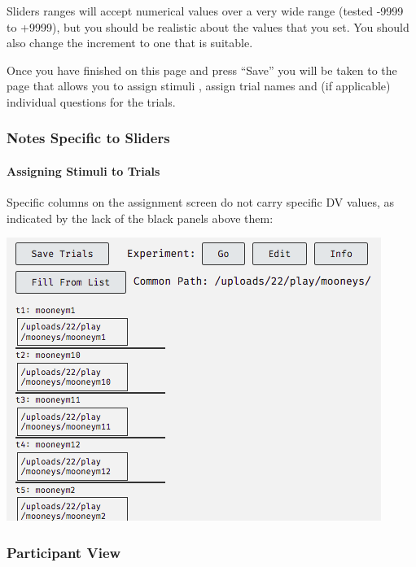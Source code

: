 \documentclass[]{book}
\let\oldparagraph\paragraph
\renewcommand{\paragraph}[1]{\oldparagraph{#1}\mbox{}}
\begin{document}
Sliders ranges will accept numerical values over a very wide range
(tested -9999 to +9999), but you should be realistic about the values
that you set. You should also change the increment to one that is
suitable.

Once you have finished on this page and press ``Save'' you will be taken
to the page that allows you to assign stimuli , assign trial names and
(if applicable) individual questions for the trials.

\subsubsection*{Notes Specific to
Sliders}\label{notes-specific-to-sliders}

\paragraph{Assigning Stimuli to
Trials}\label{assigning-stimuli-to-trials-1}

Specific columns on the assignment screen do not carry specific DV
values, as indicated by the lack of the black panels above them:

\includegraphics{images/screenshots/stim_lb.png}

\subsubsection*{Participant View}\label{participant-view-3}
\end{document}
